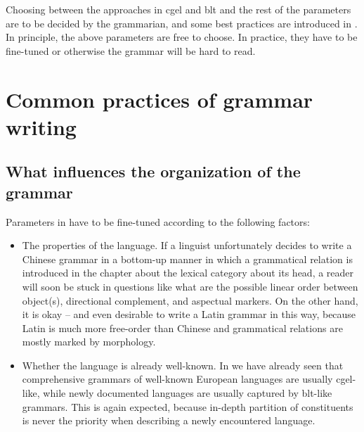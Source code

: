 \documentclass[UTF8, a4paper, oneside, scheme=plain]{ctexart}
\begin{document}
Choosing between the approaches in \ac{cgel} and \ac{blt} 
and the rest of the parameters are to be decided by the grammarian,
and some best practices are introduced in .
In principle, the above parameters are free to choose.
In practice, they have to be fine-tuned or otherwise the grammar will be hard to read.

\section{Common practices of grammar writing}\label{sec:best-practice}

\subsection{What influences the organization of the grammar}\label{sec:grammar-factors}

Parameters in  have to be fine-tuned according to the following factors:
\begin{itemize}
    \item The properties of the language. 
    If a linguist unfortunately decides to write a Chinese grammar 
    in a bottom-up manner
    in which a grammatical relation is introduced in the chapter about the lexical category about its head,
    a reader will soon be stuck in questions like 
    what are the possible linear order between object(s), directional complement, and aspectual markers.
    On the other hand, it is okay -- and even desirable to write a Latin grammar in this way,
    because Latin is much more free-order than Chinese 
    and grammatical relations are mostly marked by morphology.
    \item Whether the language is already well-known. 
    In  we have already seen that
    comprehensive grammars of well-known European languages are usually \ac{cgel}-like,
    while newly documented languages are usually captured by \ac{blt}-like grammars.
    This is again expected, because in-depth partition of constituents 
    is never the priority when describing a newly encountered language.
\end{itemize}

\end{document}
